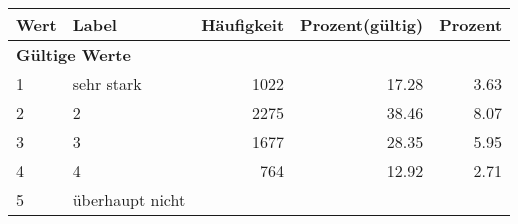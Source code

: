      \begin{longtable}{lXrrr}
     \toprule
     \textbf{Wert} & \textbf{Label} & \textbf{Häufigkeit} & \textbf{Prozent(gültig)} & \textbf{Prozent} \\
     \endhead
     \midrule
     \multicolumn{5}{l}{\textbf{Gültige Werte}}\\

     1 &
     \multicolumn{1}{X}{ sehr stark   } &


       \num{1022} &
       \num[round-mode=places,round-precision=2]{17.28} &
         \num[round-mode=places,round-precision=2]{3.63} \\

     2 &
     \multicolumn{1}{X}{ 2   } &


       \num{2275} &
       \num[round-mode=places,round-precision=2]{38.46} &
         \num[round-mode=places,round-precision=2]{8.07} \\

     3 &
     \multicolumn{1}{X}{ 3   } &


       \num{1677} &
       \num[round-mode=places,round-precision=2]{28.35} &
         \num[round-mode=places,round-precision=2]{5.95} \\

     4 &
     \multicolumn{1}{X}{ 4   } &


       \num{764} &
       \num[round-mode=places,round-precision=2]{12.92} &
         \num[round-mode=places,round-precision=2]{2.71} \\

     5 &
     \multicolumn{1}{X}{ überhaupt nicht   } &



\end{longtable}
